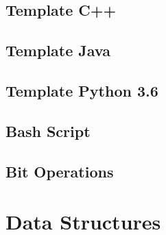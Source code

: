 \subsection{Template C++}


\subsection{Template Java}


\subsection{Template Python 3.6}


\subsection{Bash Script}




\subsection{Bit Operations}


\section{Data Structures}

% 

% 

